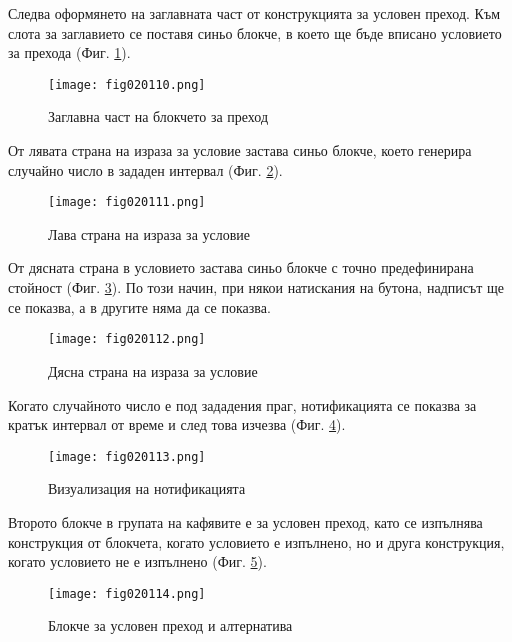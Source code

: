 Следва оформянето на заглавната част от конструкцията за условен преход. Към слота за заглавието се поставя синьо блокче, в което ще бъде вписано условието за прехода (Фиг. \ref{fig020110}).

\begin{figure}[H]
  \centering
  \texttt{[image: fig020110.png]}
  \caption{Заглавна част на блокчето за преход}
\label{fig020110}
\end{figure}

От лявата страна на израза за условие застава синьо блокче, което генерира случайно число в зададен интервал (Фиг. \ref{fig020111}).

\begin{figure}[H]
  \centering
  \texttt{[image: fig020111.png]}
  \caption{Лава страна на израза за условие}
\label{fig020111}
\end{figure}

От дясната страна в условието застава синьо блокче с точно предефинирана стойност (Фиг. \ref{fig020112}). По този начин, при някои натискания на бутона, надписът ще се показва, а в другите няма да се показва. 

\begin{figure}[H]
  \centering
  \texttt{[image: fig020112.png]}
  \caption{Дясна страна на израза за условие}
\label{fig020112}
\end{figure}

Когато случайното число е под зададения праг, нотификацията се показва за кратък интервал от време и след това изчезва (Фиг. \ref{fig020113}).

\begin{figure}[H]
  \centering
  \texttt{[image: fig020113.png]}
  \caption{Визуализация на нотификацията}
\label{fig020113}
\end{figure}

Второто блокче в групата на кафявите е за условен преход, като се изпълнява конструкция от блокчета, когато условието е изпълнено, но и друга конструкция, когато условието не е изпълнено (Фиг. \ref{fig020114}).

\begin{figure}[H]
  \centering
  \texttt{[image: fig020114.png]}
  \caption{Блокче за условен преход и алтернатива}
\label{fig020114}
\end{figure}

